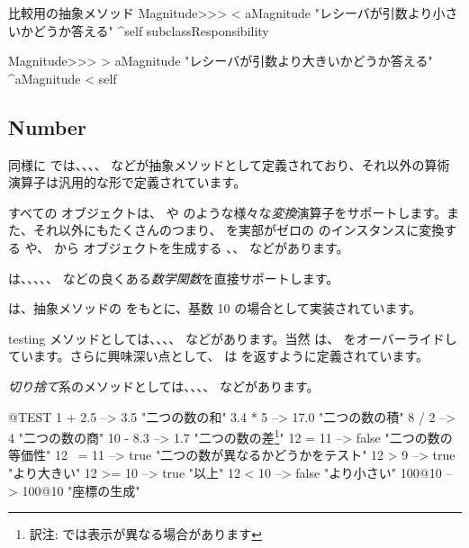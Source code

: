 \documentclass[a4paper,10pt,twoside]{book}
\begin{document}
\begin{method}{比較用の抽象メソッド}
Magnitude>>> < aMagnitude 
    "レシーバが引数より小さいかどうか答える"
    ^self subclassResponsibility

Magnitude>>> > aMagnitude 
    "レシーバが引数より大きいかどうか答える"
    ^aMagnitude < self
\end{method}

\subsection{Number}

同様に  では、、、、 などが抽象メソッドとして定義されており、それ以外の算術演算子は汎用的な形で定義されています。

すべての  オブジェクトは、 や  のような様々な\emph{変換}演算子をサポートします。また、それ以外にもたくさんのつまり、 を実部がゼロの  のインスタンスに変換する  や、 から  オブジェクトを生成する 、、 などがあります。

 は、、、、、 などの良くある\emph{数学関数}を直接サポートします。

 は、抽象メソッドの  をもとに、基数 10 の場合として実装されています。

testing メソッドとしては、、、、 などがあります。当然  は、 をオーバーライドしています。さらに興味深い点として、 は  を返すように定義されています。

\emph{切り捨て}系のメソッドとしては、、、、 などがあります。

\begin{code}{@TEST}%
1 + 2.5     --> 3.5             "二つの数の和"
3.4 * 5      --> 17.0           "二つの数の積"
8 / 2         --> 4                 "二つの数の商"
10 - 8.3   --> 1.7              "二つの数の差\footnote{訳注:  では表示が異なる場合があります}"
12 = 11    --> false           "二つの数の等価性"
12 ~= 11 --> true            "二つの数が異なるかどうかをテスト"
12 > 9      --> true            "より大きい"
12 >= 10  --> true            "以上"
12 < 10    --> false           "より小さい"
100@10   --> 100@10    "座標の生成"
\end{code}
\end{document}
